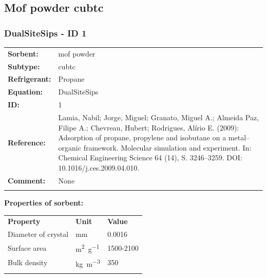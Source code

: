 \subsection{Mof powder cubtc}
%
\subsubsection{DualSiteSips - ID 1}
%
\begin{tabular}[l]{|lp{11.5cm}|}
\hline
\addlinespace

\textbf{Sorbent:} & mof powder \\
\textbf{Subtype:} & cubtc \\
\textbf{Refrigerant:} & Propane \\
\textbf{Equation:} & DualSiteSips \\
\textbf{ID:} & 1 \\
\textbf{Reference:} & Lamia, Nabil; Jorge, Miguel; Granato, Miguel A.; Almeida Paz, Filipe A.; Chevreau, Hubert; Rodrigues, Alírio E. (2009): Adsorption of propane, propylene and isobutane on a metal–organic framework. Molecular simulation and experiment. In: Chemical Engineering Science 64 (14), S. 3246–3259. DOI: 10.1016/j.ces.2009.04.010. \\
\textbf{Comment:} & None \\

\addlinespace
\hline
\end{tabular}
\newline

\textbf{Properties of sorbent:}
\newline
%
\begin{longtable}[l]{lll}
\toprule
\addlinespace
\textbf{Property} & \textbf{Unit} & \textbf{Value} \\
\addlinespace
\midrule
\endhead
\bottomrule
\endfoot
\bottomrule
\endlastfoot
\addlinespace

Diameter of crystal & \si{\milli\meter} & 0.0016\\
Surface area & \si{\square\meter\per\gram} & 1500-2100\\
Bulk density & \si{\kilogram\per\cubic\meter} & 350\\

\addlinespace\end{longtable}

